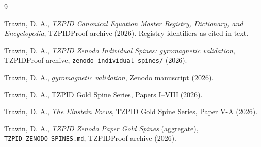 \documentclass[11pt]{article}
\theoremstyle{remark}
\begin{document}
\begin{thebibliography}{9}

 Trawin, D. A., \emph{TZPID Canonical Equation Master Registry, Dictionary, and Encyclopedia}, TZPIDProof archive (2026). Registry identifiers as cited in text.

 Trawin, D. A., \emph{TZPID Zenodo Individual Spines: gyromagnetic validation}, TZPIDProof archive, \texttt{zenodo\_individual\_spines/} (2026).

 Trawin, D. A., \emph{gyromagnetic validation}, Zenodo manuscript (2026).

 Trawin, D. A., TZPID Gold Spine Series, Papers I--VIII (2026).

 Trawin, D. A., \emph{The Einstein Focus}, TZPID Gold Spine Series, Paper V-A (2026).

 Trawin, D. A., \emph{TZPID Zenodo Paper Gold Spines} (aggregate), \texttt{TZPID\_ZENODO\_SPINES.md}, TZPIDProof archive (2026).

\end{thebibliography}
\end{document}
